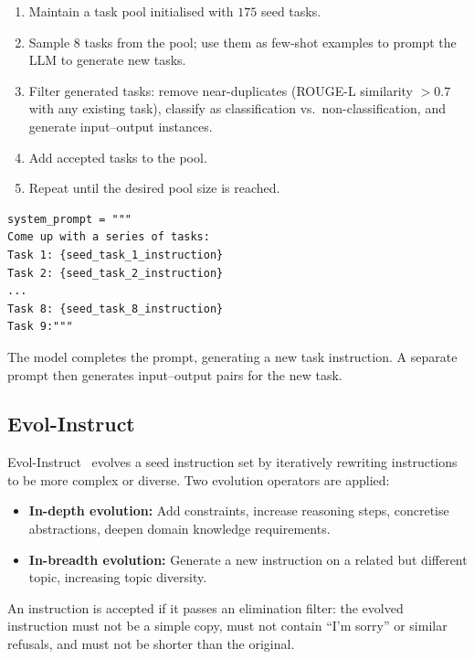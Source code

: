 \begin{enumerate}
  \item Maintain a task pool initialised with $175$ seed tasks.
  \item Sample $8$ tasks from the pool; use them as few-shot examples to prompt the LLM to generate new tasks.
  \item Filter generated tasks: remove near-duplicates (ROUGE-L similarity $> 0.7$ with any existing task), classify as classification vs.~non-classification, and generate input--output instances.
  \item Add accepted tasks to the pool.
  \item Repeat until the desired pool size is reached.
\end{enumerate}

\begin{examplebox}
\begin{lstlisting}[style=pythonstyle]
system_prompt = """
Come up with a series of tasks:
Task 1: {seed_task_1_instruction}
Task 2: {seed_task_2_instruction}
...
Task 8: {seed_task_8_instruction}
Task 9:"""
\end{lstlisting}

The model completes the prompt, generating a new task instruction. A separate prompt then generates input--output pairs for the new task.
\end{examplebox}

\subsection{Evol-Instruct}
\label{evol-instruct}

Evol-Instruct~\cite{xu2023wizardlm} evolves a seed instruction set by iteratively rewriting instructions to be more complex or diverse. Two evolution operators are applied:

\begin{itemize}
  \item \textbf{In-depth evolution:} Add constraints, increase reasoning steps, concretise abstractions, deepen domain knowledge requirements.
  \item \textbf{In-breadth evolution:} Generate a new instruction on a related but different topic, increasing topic diversity.
\end{itemize}

An instruction is accepted if it passes an elimination filter: the evolved instruction must not be a simple copy, must not contain ``I’m sorry'' or similar refusals, and must not be shorter than the original.

